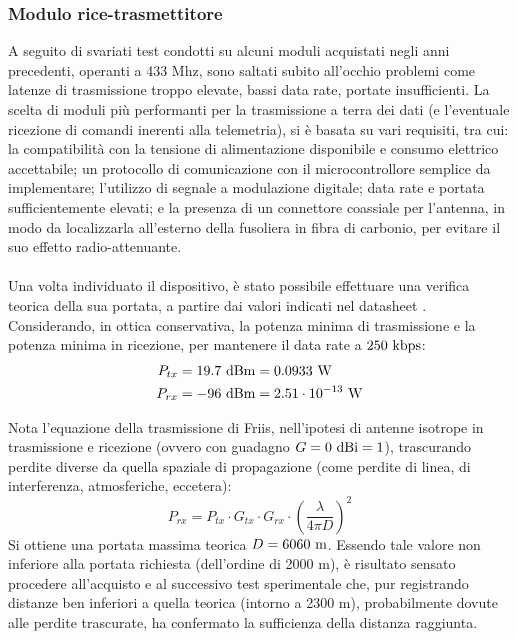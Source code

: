 \documentclass[12pt]{article}
\begin{document}
\subsubsection{Modulo rice-trasmettitore}
A seguito di svariati test condotti su alcuni moduli acquistati negli anni precedenti, operanti a 433 Mhz, sono saltati subito all'occhio problemi come latenze di trasmissione troppo elevate, bassi data rate, portate insufficienti.
La scelta di moduli più performanti per la trasmissione a terra dei dati (e l'eventuale ricezione di comandi inerenti alla telemetria), si è basata su vari requisiti, tra cui: la compatibilità con la tensione di alimentazione disponibile e consumo elettrico accettabile; un protocollo di comunicazione con il microcontrollore semplice da implementare; l'utilizzo di segnale a modulazione digitale; data rate e portata  sufficientemente elevati; e la presenza di un connettore coassiale per l'antenna, in modo da localizzarla all'esterno della fusoliera in fibra di carbonio, per evitare il suo effetto radio-attenuante.
\\\\
Una volta individuato il dispositivo, è stato possibile effettuare una verifica teorica della sua portata, a partire dai valori indicati nel datasheet \cite{rf-datasheet}. Considerando, in ottica conservativa, la potenza minima di trasmissione e la potenza minima in ricezione, per mantenere il data rate a $250 \textnormal{ kbps}$:
\begin{equation}
\begin{split}
P_{tx} &= 19.7 \textnormal{ dBm} = 0.0933 \textnormal{ W} \\
P_{rx} &= -96 \textnormal{ dBm} = 2.51 \cdot 10^{-13} \textnormal{ W}
\end{split}
\end{equation}

\noindent
Nota l'equazione della trasmissione di Friis, nell'ipotesi di antenne isotrope in trasmissione e ricezione (ovvero con guadagno $G = 0 \textnormal{ dBi} = 1$), trascurando perdite diverse da quella spaziale di propagazione (come perdite di linea, di interferenza, atmosferiche, eccetera):
\begin{equation}
P_{rx} = P_{tx} \cdot G_{tx} \cdot G_{rx} \cdot \left(\frac{\lambda}{4 \pi D}\right)^2
\end{equation}
Si ottiene una portata massima teorica $D = 6060 \textnormal{ m}$. Essendo tale valore non inferiore alla portata richiesta (dell'ordine di 2000 m), è risultato sensato procedere all'acquisto e al successivo test sperimentale che, pur registrando distanze ben inferiori a quella teorica (intorno a 2300 m), probabilmente dovute alle perdite trascurate, ha confermato la sufficienza della distanza raggiunta.
\end{document}

